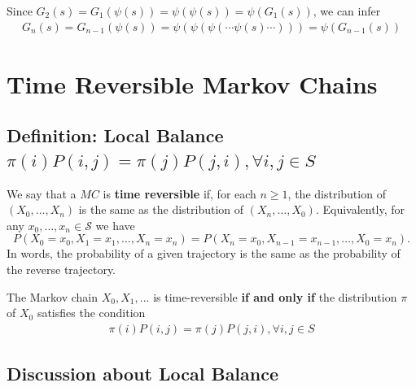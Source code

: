 \documentclass[11pt]{elegantbook}
\begin{document}
Since $G_2(s)=G_1(\psi(s))=\psi(\psi(s))=\psi(G_1(s))$, we can infer
\begin{equation}
    \begin{aligned}
        G_n(s)=G_{n-1}(\psi(s))=\psi(\psi(\psi(\cdots\psi(s)\cdots)))=\psi(G_{n-1}(s))
    \end{aligned}
    \nonumber
\end{equation}




















\chapter{Time Reversible Markov Chains}
\section{Definition: Local Balance $\pi(i)P(i,j)=\pi(j)P(j,i),\forall i,j\in S$}
\begin{definition}
    We say that a $M C$ is \textbf{time reversible} if, for each $n \geq 1$, the distribution of $\left(X_0, \ldots, X_n\right)$ is the same as the distribution of $\left(X_n, \ldots, X_0\right)$. Equivalently, for any $x_0, \ldots, x_n \in \mathcal{S}$ we have
    $$
    P\left(X_0=x_0, X_1=x_1, \ldots, X_n=x_n\right)=P\left(X_n=x_0, X_{n-1}=x_{n-1}, \ldots, X_0=x_n\right) .
    $$
    In words, the probability of a given trajectory is the same as the probability of the reverse trajectory.
\end{definition}

\begin{lemma}
    The Markov chain $X_0, X_1, . . .$ is time-reversible \textbf{if and only if} the distribution $\pi$ of $X_0$ satisfies the condition
    \begin{equation}
        \begin{aligned}
            \pi(i)P(i,j)=\pi(j)P(j,i),\forall i,j\in S
        \end{aligned}
        \nonumber
    \end{equation}
\end{lemma}

\section{Discussion about Local Balance}
\end{document}
